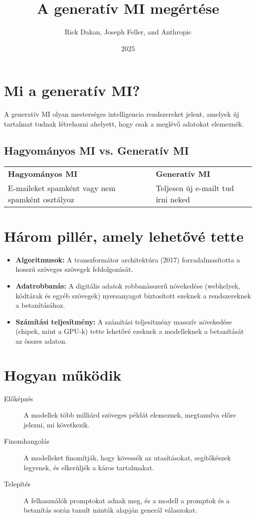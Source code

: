 \documentclass[a4paper, 11pt]{article}
\makeatletter
\renewcommand{\maketitle}{
  \begin{center}
    {\fontsize{22}{26}\bfseries\color{primary}\@title}
    \vspace{0.5em}
    {\color{lightgray}\titlerule[3pt]}
    \vspace{1.5em}
  \end{center}
}
\makeatother
\begin{document}
\title{A generatív MI megértése}
\author{Rick Dakan, Joseph Feller, and Anthropic}
\date{2025}
\maketitle

\section*{Mi a generatív MI?}
A generatív MI olyan mesterséges intelligencia rendszereket jelent, amelyek új tartalmat tudnak létrehozni ahelyett, hogy csak a meglévő adatokat elemeznék.

\subsection*{Hagyományos MI vs. Generatív MI}
\begin{tabular}{ll}
\textbf{Hagyományos MI} & \textbf{Generatív MI} \\
E-maileket spamként vagy nem spamként osztályoz & Teljesen új e-mailt tud írni neked \\
\end{tabular}

\section*{Három pillér, amely lehetővé tette}
\begin{itemize}
    \item \textbf{Algoritmusok:} A transzformátor architektúra (2017) forradalmasította a hosszú szöveges szövegek feldolgozását.
    \item \textbf{Adatrobbanás:} A digitális adatok robbanásszerű növekedése (webhelyek, kódtárak és egyéb szövegek) nyersanyagot biztosított ezeknek a rendszereknek a betanításához.
    \item \textbf{Számítási teljesítmény:} A számítási teljesítmény masszív növekedése (chipek, mint a GPU-k) tette lehetővé ezeknek a modelleknek a betanítását az összes adaton.
\end{itemize}

\section*{Hogyan működik}
\begin{description}
    \item[Előképzés] A modellek több milliárd szöveges példát elemeznek, megtanulva előre jelezni, mi következik.
    \item[Finomhangolás] A modelleket finomítják, hogy kövessék az utasításokat, segítőkészek legyenek, és elkerüljék a káros tartalmakat.
    \item[Telepítés] A felhasználók promptokat adnak meg, és a modell a promptok és a betanítás során tanult minták alapján generál válaszokat.
\end{description}
\end{document}
